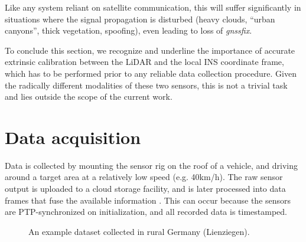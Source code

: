 Like any system reliant on satellite communication, this will suffer significantly in situations where the signal propagation is disturbed (heavy clouds, ``urban canyons'', thick vegetation, spoofing), even leading to loss of \emph{\gls{gnssfix}}.

To conclude this section, we recognize and underline the importance of accurate extrinsic calibration between the LiDAR and the local INS coordinate frame, which has to be performed prior to any reliable data collection procedure. Given the radically different modalities of these two sensors, this is not a trivial task \cite{lidar-gps-calib} and lies outside the scope of the current work.



\section{Data acquisition}

Data is collected by mounting the sensor rig on the roof of a vehicle, and driving around a target area at a relatively low speed (e.g. 40km/h). 
The raw sensor output is uploaded to a cloud storage facility, and is later processed into data frames that fuse the available information . This can occur because the sensors are PTP-synchronized on initialization, and all recorded data is timestamped.

\begin{figure}
    \centering
    \hspace{1pt}
    \caption[Example dataset trajectory]{An example dataset collected in rural Germany (Lienziegen).}
    \label{fig:example-trajectory}
\end{figure}

